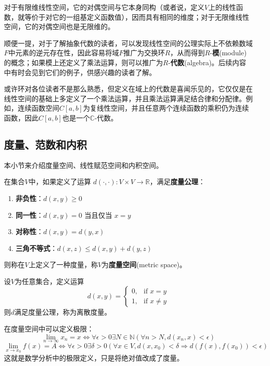 \documentclass{ctexbook}
\begin{document}
对于有限维线性空间，它的对偶空间与它本身同构（或者说，定义$V$上的线性函数，就等价于对它的一组基定义函数值），因而具有相同的维度；对于无限维线性空间，它的对偶空间也是无限维的。

顺便一提，对于了解抽象代数的读者，可以发现线性空间的公理实际上不依赖数域$F$中元素的逆元存在性，因此容易将域$F$推广为交换环$R$，从而得到$R$-\textbf{模}(module)的概念；如果模上还定义了乘法运算，则可以推广为$R$-\textbf{代数}(algebra)。后续内容中有时会见到它们的例子，供感兴趣的读者了解。

\begin{example}
    或许环对各位读者不是那么熟悉，但定义在域上的代数是喜闻乐见的，它仅仅是在线性空间的基础上多定义了一个乘法运算，并且乘法运算满足结合律和分配律。例如，连续函数空间$C[a,b]$为复线性空间，并且任意两个连续函数的乘积仍为连续函数，因此$C[a,b]$也是一个$\mathbb{C}$-代数。
\end{example}

\subsection{度量、范数和内积}\label{sub:measurement}

本小节来介绍度量空间、线性赋范空间和内积空间\cite{linear_algebra}。
\begin{definition}[度量]
    在集合$V$中，如果定义了运算
$d(\cdot,\cdot):V\times V\rightarrow \mathbb{R}  $，满足\textbf{度量公理}：
\begin{enumerate}
    \item \textbf{非负性}：$d(x, y) \geq 0$
    \item \textbf{同一性}：$d(x, y) = 0$ 当且仅当 $x = y$
    \item \textbf{对称性}：$d(x, y) = d(y, x)$
    \item \textbf{三角不等式}：$d(x, z) \leq d(x, y) + d(y, z)$
\end{enumerate}
则称在$V$上定义了一种度量，称$V$为\textbf{度量空间}(metric space)。
\end{definition}

\begin{example}[离散度量]
    设$V$为任意集合，定义运算
    \[
    d(x,y) = \begin{cases}
    0, & \text{if } x = y \\
    1, & \text{if } x \neq y
    \end{cases}
    \]
    则$d$满足度量公理，称为离散度量。
\end{example}

在度量空间中可以定义极限：
\[\lim_{n\to\infty}x_n=x\iff \forall \epsilon>0\exists N\in\mathbb{N} (\forall n>N,d(x_n,x)<\epsilon)\]
\[\lim_{x\to x_0}f(x)=A\iff \forall \epsilon>0\exists \delta>0(\forall x\in V,d(x,x_0)<\delta\Rightarrow d(f(x),f(x_0))<\epsilon)\]
这就是数学分析中的极限定义，只是将绝对值改成了度量。
\end{document}
